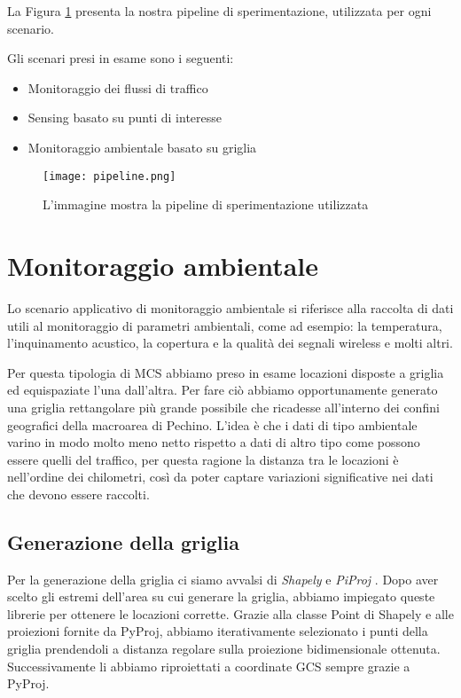 La Figura \ref{fig:pipeline} presenta la nostra pipeline di sperimentazione, utilizzata per ogni scenario.

Gli scenari presi in esame sono i seguenti:
\begin{itemize}
	\item Monitoraggio dei flussi di traffico
	\item Sensing basato su punti di interesse
	\item Monitoraggio ambientale basato su griglia
\end{itemize}


\begin{figure}[H]
	\centering 
	\texttt{[image: pipeline.png]}
	\caption[Pipeline di sperimentazione]{L'immagine mostra la pipeline di sperimentazione utilizzata}
	\label{fig:pipeline}
\end{figure}


\section{Monitoraggio ambientale}
Lo scenario applicativo di monitoraggio ambientale si riferisce alla raccolta di dati utili al monitoraggio di parametri ambientali, come ad esempio: la temperatura, l'inquinamento acustico, la copertura e la qualità dei segnali wireless e molti altri. 

Per questa tipologia di MCS abbiamo preso in esame locazioni disposte a griglia ed equispaziate l'una dall'altra. Per fare ciò abbiamo opportunamente generato una griglia rettangolare più grande possibile che ricadesse all'interno dei confini geografici della macroarea di Pechino. L'idea è che i dati di tipo ambientale varino in modo molto meno netto rispetto a dati di altro tipo come possono essere quelli del traffico, per questa ragione la distanza tra le locazioni è nell'ordine dei chilometri, così da poter captare variazioni significative nei dati che devono essere raccolti. 

\subsection{Generazione della griglia}
Per la generazione della griglia ci siamo avvalsi di \textit{Shapely} \cite{shapely} e \textit{PiProj} \cite{pyproj}.
Dopo aver scelto gli estremi dell'area su cui generare la griglia, abbiamo impiegato queste librerie per ottenere le locazioni corrette. Grazie alla classe Point di Shapely e alle proiezioni fornite da PyProj, abbiamo iterativamente selezionato i punti della griglia prendendoli a distanza regolare sulla proiezione bidimensionale ottenuta. Successivamente li abbiamo riproiettati  a coordinate GCS sempre grazie a PyProj. 

